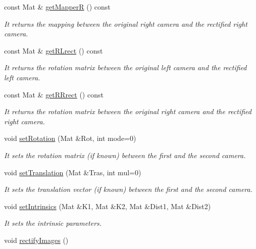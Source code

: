 \begin{DoxyCompactItemize}
const Mat \& \mbox{\hyperlink{classStereoCamera_ac3f7763fdb6ed57f96924bb0b32b4ea7}{get\+MapperR}} () const
\begin{DoxyCompactList}\small\item\em It returns the mapping between the original right camera and the rectified right camera. \end{DoxyCompactList}\item 
const Mat \& \mbox{\hyperlink{classStereoCamera_ab3adb747963c617fd2fe1a919b0c59c7}{get\+R\+Lrect}} () const
\begin{DoxyCompactList}\small\item\em It returns the rotation matrix between the original left camera and the rectified left camera. \end{DoxyCompactList}\item 
const Mat \& \mbox{\hyperlink{classStereoCamera_a44e111911af89a299b134fd91b4bc7d6}{get\+R\+Rrect}} () const
\begin{DoxyCompactList}\small\item\em It returns the rotation matrix between the original right camera and the rectified right camera. \end{DoxyCompactList}\item 
void \mbox{\hyperlink{classStereoCamera_a1329b3894d527e1505618f57a1304624}{set\+Rotation}} (Mat \&Rot, int mode=0)
\begin{DoxyCompactList}\small\item\em It sets the rotation matrix (if known) between the first and the second camera. \end{DoxyCompactList}\item 
void \mbox{\hyperlink{classStereoCamera_a7b10f1218e8e70f47b22080ba1820d39}{set\+Translation}} (Mat \&Tras, int mul=0)
\begin{DoxyCompactList}\small\item\em It sets the translation vector (if known) between the first and the second camera. \end{DoxyCompactList}\item 
void \mbox{\hyperlink{classStereoCamera_a54754623497c8dddb61f520e17f465f8}{set\+Intrinsics}} (Mat \&K1, Mat \&K2, Mat \&Dist1, Mat \&Dist2)
\begin{DoxyCompactList}\small\item\em It sets the intrinsic parameters. \end{DoxyCompactList}\item 
void \mbox{\hyperlink{classStereoCamera_ae5ac866c6d4b6c4819b01a918e7b61e0}{rectify\+Images}} ()

\end{DoxyCompactItemize}
